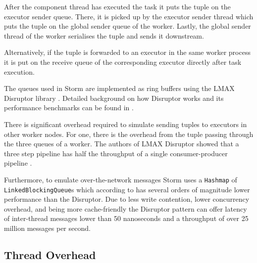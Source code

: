 After the component thread has executed the task it puts the tuple on the executor sender queue. There, it is picked up by the executor sender thread which puts the tuple on the global sender queue of the worker. Lastly, the global sender thread of the worker serialises the tuple and sends it downstream.

Alternatively, if the tuple is forwarded to an executor in the same worker process it is put on the receive queue of the corresponding executor directly after task execution.

The queues used in Storm are implemented as ring buffers using the LMAX Disruptor library \citep{LMAXDisruptor}. Detailed background on how Disruptor works and its performance benchmarks can be found in \citep{Thompson_Farley_Barker_Gee_Stewart_2011}.

There is significant overhead required to simulate sending tuples to executors in other worker nodes. For one, there is the overhead from the tuple passing through the three queues of a worker. The authors of LMAX Disruptor showed that a three step pipeline has half the throughput of a single consumer-producer pipeline \citep{DisruptorWiki}.

Furthermore, to emulate over-the-network messages Storm uses a \texttt{Hashmap} of \texttt{LinkedBlockingQueue}s which according to \cite{Thompson_Farley_Barker_Gee_Stewart_2011} has several orders of magnitude lower performance than the Disruptor. Due to less write contention, lower concurrency overhead, and being more cache-friendly the Disruptor pattern can offer latency of inter-thread messages lower than 50 nanoseconds and a throughput of over 25 million messages per second.

\subsection{Thread Overhead}


